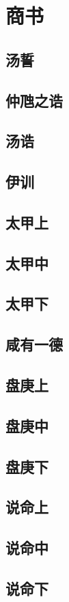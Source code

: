 \documentclass[a4paper,12pt,UTF8,twoside]{ctexbook}
\begin{document}
\part{商书}

\chapter{汤誓}
\chapter{仲虺之诰}
\chapter{汤诰}
\chapter{伊训}
\chapter{太甲上}
\chapter{太甲中}
\chapter{太甲下}
\chapter{咸有一德}
\chapter{盘庚上}
\chapter{盘庚中}
\chapter{盘庚下}
\chapter{说命上}
\chapter{说命中}
\chapter{说命下}
\end{document}

